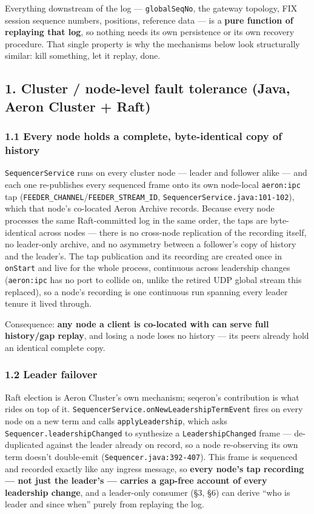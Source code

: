 \documentclass[
  10pt,
]{article}
\begin{document}
Everything downstream of the log --- \texttt{globalSeqNo}, the gateway
topology, FIX session sequence numbers, positions, reference data --- is
a \textbf{pure function of replaying that log}, so nothing needs its own
persistence or its own recovery procedure. That single property is why
the mechanisms below look structurally similar: kill something, let it
replay, done.

\subsection{1. Cluster / node-level fault tolerance (Java, Aeron Cluster
+
Raft)}\label{cluster-node-level-fault-tolerance-java-aeron-cluster-raft}

\subsubsection{1.1 Every node holds a complete, byte-identical copy of
history}\label{every-node-holds-a-complete-byte-identical-copy-of-history}

\texttt{SequencerService} runs on every cluster node --- leader and
follower alike --- and each one re-publishes every sequenced frame onto
its own node-local \texttt{aeron:ipc} tap
(\texttt{FEEDER\_CHANNEL}/\texttt{FEEDER\_STREAM\_ID},
\texttt{SequencerService.java:101-102}), which that node's co-located
Aeron Archive records. Because every node processes the same
Raft-committed log in the same order, the taps are byte-identical across
nodes --- there is no cross-node replication of the recording itself, no
leader-only archive, and no asymmetry between a follower's copy of
history and the leader's. The tap publication and its recording are
created once in \texttt{onStart} and live for the whole process,
continuous across leadership changes (\texttt{aeron:ipc} has no port to
collide on, unlike the retired UDP global stream this replaced), so a
node's recording is one continuous run spanning every leader tenure it
lived through.

Consequence: \textbf{any node a client is co-located with can serve full
history/gap replay}, and losing a node loses no history --- its peers
already hold an identical complete copy.

\subsubsection{1.2 Leader failover}\label{leader-failover}

Raft election is Aeron Cluster's own mechanism; seqeron's contribution
is what rides on top of it.
\texttt{SequencerService.onNewLeadershipTermEvent} fires on every node
on a new term and calls \texttt{applyLeadership}, which asks
\texttt{Sequencer.leadershipChanged} to synthesize a
\texttt{LeadershipChanged} frame --- de-duplicated against the leader
already on record, so a node re-observing its own term doesn't
double-emit (\texttt{Sequencer.java:392-407}). This frame is sequenced
and recorded exactly like any ingress message, so \textbf{every node's
tap recording --- not just the leader's --- carries a gap-free account
of every leadership change}, and a leader-only consumer (§3, §6) can
derive ``who is leader and since when'' purely from replaying the log.
\end{document}
